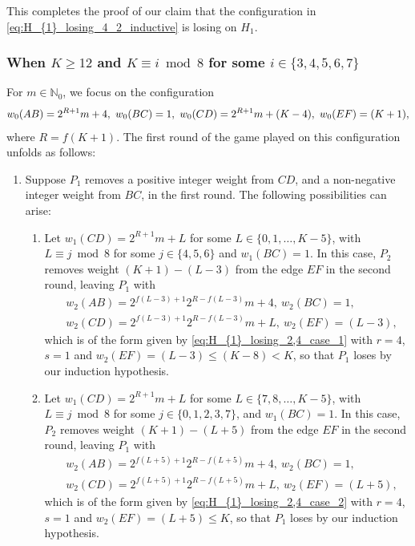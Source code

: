 \documentclass[11pt,reqno]{amsart}
\theoremstyle{definition}
\theoremstyle{definition}
\begin{document}
This completes the proof of our claim that the configuration in \eqref{eq:H_{1}_losing_4_2_inductive} is losing on $H_{1}$.

\subsubsection{When $K \geqslant 12$ and $K \equiv i \bmod 8$ for some $i \in \{3,4,5,6,7\}$}\label{subsubsec:H_{1}_losing_4_3,4,5,6,7} For $m \in \mathbb{N}_{0}$, we focus on the configuration
\begin{align}
w_{0}(AB)=2^{R+1}m+4,\ w_{0}(BC)=1,\ w_{0}(CD)=2^{R+1}m+(K-4),\ w_{0}(EF)=(K+1),\label{eq:H_{1}_losing_4_1_inductive}
\end{align}
where $R=f(K+1)$. The first round of the game played on this configuration unfolds as follows:
\begin{enumerate}
\item Suppose $P_{1}$ removes a positive integer weight from $CD$, and a non-negative integer weight from $BC$, in the first round. The following possibilities can arise:
\begin{enumerate}
\item Let $w_{1}(CD)=2^{R+1}m+L$ for some $L \in \{0,1,\ldots,K-5\}$, with $L \equiv j \bmod 8$ for some $j \in \{4,5,6\}$ and $w_{1}(BC)=1$. In this case, $P_{2}$ removes weight $(K+1)-(L-3)$ from the edge $EF$ in the second round, leaving $P_{1}$ with
\begin{align}
{}&w_{2}(AB)=2^{f(L-3)+1}2^{R-f(L-3)}m+4,\ w_{2}(BC)=1,\nonumber\\
{}&w_{2}(CD)=2^{f(L-3)+1}2^{R-f(L-3)}m+L,\ w_{2}(EF)=(L-3),\nonumber
\end{align}
which is of the form given by \eqref{eq:H_{1}_losing_2,4_case_1} with $r=4$, $s=1$ and $w_{2}(EF)=(L-3)\leqslant (K-8)<K$, so that $P_{1}$ loses by our induction hypothesis.

\item Let $w_{1}(CD)=2^{R+1}m+L$ for some $L \in \{7,8,\ldots,K-5\}$, with $L \equiv j \bmod 8$ for some $j \in \{0,1,2,3,7\}$, and $w_{1}(BC)=1$. In this case, $P_{2}$ removes weight $(K+1)-(L+5)$ from the edge $EF$ in the second round, leaving $P_{1}$ with
\begin{align}
{}&w_{2}(AB)=2^{f(L+5)+1}2^{R-f(L+5)}m+4,\ w_{2}(BC)=1,\nonumber\\
{}&w_{2}(CD)=2^{f(L+5)+1}2^{R-f(L+5)}m+L,\ w_{2}(EF)=(L+5),\nonumber
\end{align}
which is of the form given by \eqref{eq:H_{1}_losing_2,4_case_2} with $r=4$, $s=1$ and $w_{2}(EF)=(L+5) \leqslant K$, so that $P_{1}$ loses by our induction hypothesis.


\end{enumerate}
\end{enumerate}
\end{document}
